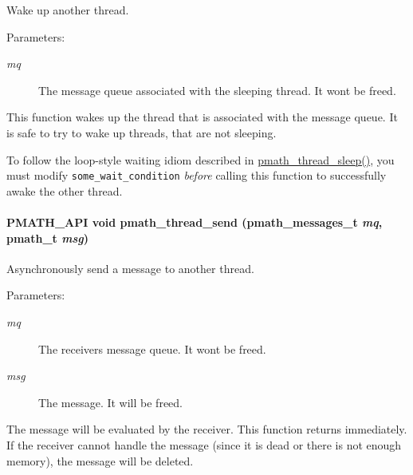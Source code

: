 Wake up another thread. 

\begin{Desc}
\item[Parameters:]
\begin{description}
\item[{\em mq}]The message queue associated with the sleeping thread. It wont be freed.\end{description}
\end{Desc}
This function wakes up the thread that is associated with the message queue. It is safe to try to wake up threads, that are not sleeping.

To follow the loop-style waiting idiom described in \hyperlink{group__threadmsg_gce6da6e34b0aeab35094ddccdd9a3e55}{pmath\_\-thread\_\-sleep()}, you must modify {\tt some\_\-wait\_\-condition} {\em before\/} calling this function to successfully awake the other thread. \hypertarget{group__threadmsg_ga3867a708fb07b86e017e8f201ef7edd}{
\paragraph[{pmath\_\-thread\_\-send}]{\setlength{\rightskip}{0pt plus 5cm}PMATH\_\-API void pmath\_\-thread\_\-send ({\bf pmath\_\-messages\_\-t} {\em mq}, \/  {\bf pmath\_\-t} {\em msg})}\hfill}
\label{group__threadmsg_ga3867a708fb07b86e017e8f201ef7edd}


Asynchronously send a message to another thread. 

\begin{Desc}
\item[Parameters:]
\begin{description}
\item[{\em mq}]The receivers message queue. It wont be freed. \item[{\em msg}]The message. It will be freed.\end{description}
\end{Desc}
The message will be evaluated by the receiver. This function returns immediately. If the receiver cannot handle the message (since it is dead or there is not enough memory), the message will be deleted.

